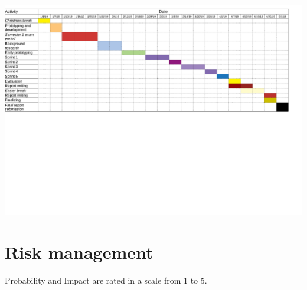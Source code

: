 \documentclass{article}
\begin{document}
\begin{center}
	\begin{sideways}%
		\begin{minipage}{0.92\textheight}
			\includegraphics[width=\linewidth,keepaspectratio]
			{final-gannt.pdf}
			\label{fig:xx}
		\end{minipage}
	\end{sideways}
\end{center}


\section{Risk management} \label{sec:appendix-risk}
Probability and Impact are rated in a scale from 1 to 5.

\def\riska{Loss of source code at some stage of development}
\def \probabilitya {1}
\def \impacta {4}
\def \mitigationa {Use of remote source control  repository to frequently record every stage of the development, thus being able to recover it if needed. }

\def\riskaa{Unable to fulfill all of the requirements due to technical implemention difficulties}
\def \probabilityaa {3}
\def \impactaa {2}
\def \mitigationaa {At the start of development process requirements will be split into tasks, divided into sprints and ranked using MoSCoW prioritization, therefore ensuring that core functionality will be implemented first and a working proof of concept is available at the end of the project }

\def\riskaaa{Insufficient time to develop a prototype due to other course modules}
\def \probabilityaaa {2}
\def \impactaaa {2}
\def \mitigationaaa {Dedicate fixed amount of time every week for the project in order to keep up with the schedule }
\end{document}
